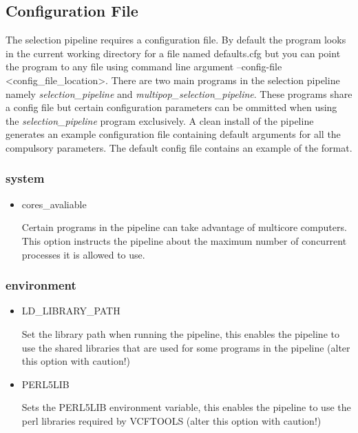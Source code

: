 \documentclass[a4paper,10pt]{article}
\begin{document}
                             \subsection{Configuration File}
                             The selection pipeline requires a configuration file. By default the
                             program looks in the current working directory for a file named
                             defaults.cfg but you can point the program to any file using command
                             line argument --config-file <config\_file\_location>. There are two
                             main programs in the selection pipeline namely
                             \emph{selection\_pipeline} and \emph{multipop\_selection\_pipeline}. These
                             programs share a config file but certain configuration parameters can
                             be ommitted when using the \emph{selection\_pipeline} program
                             exclusively. A clean install of the pipeline generates an example
                             configuration file containing default arguments for all the compulsory
                             parameters. The default config file contains an example of the format.
                             \subsubsection{system}
                             \begin{itemize}
                             \item cores\_avaliable

                             Certain programs in the pipeline can take advantage of multicore
                             computers. This option instructs the pipeline about the maximum number
                             of concurrent processes it is allowed to use.
                             \end{itemize}
                             \subsubsection{environment}
                             \begin{itemize}
                             \item LD\_LIBRARY\_PATH

                             Set the library path when running the pipeline, this enables the
                             pipeline to use the shared libraries that are used for some programs
                             in the pipeline (alter this option with caution!)

                             \item PERL5LIB

                             Sets the PERL5LIB environment variable, this enables the pipeline to
                             use the perl libraries required by VCFTOOLS (alter this option with
                             caution!)

                             \end{itemize}
\end{document}
